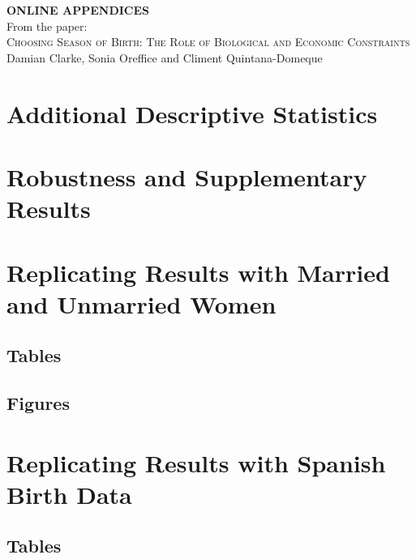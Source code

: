 \documentclass[a4paper, 12 pt]{article}
\theoremstyle{plain}
\begin{document}
\begin{spacing}{1.4}
\begin{center}
\textbf{ONLINE APPENDICES} \\
\vspace{4mm}
From the paper: \\
\vspace{6mm}
{\large \textsc{Choosing Season of Birth:
The Role of Biological and Economic Constraints}} \\
Damian Clarke, Sonia Oreffice and Climent Quintana-Domeque
\end{center}

\tableofcontents


\setlength\parindent{0.25in}
\setlength\parskip{0.25in}




\newpage
\section{Additional Descriptive Statistics}

\clearpage

\section{Robustness and Supplementary Results}

\clearpage



\section{Replicating Results with Married and Unmarried Women}
\subsection{Tables}

\newpage
\subsection{Figures}



\clearpage
\section{Replicating Results with Spanish Birth Data}
\subsection{Tables}



\end{spacing}
\end{document}
